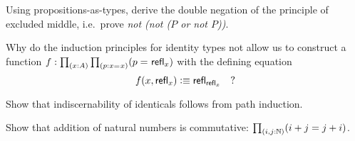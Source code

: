 \begin{solution}[Zack]
  
\end{solution}

\begin{ex}\label{ex:not-not-lem}
  Using propositions-as-types, derive the double negation of the principle of excluded middle, i.e.\ prove \emph{not (not ($P$ or not $P$))}.
\end{ex}

\begin{solution}[Alan]
  
\end{solution}

\begin{solution}[Zack]
  
\end{solution}

\begin{ex}\label{ex:without-K}
  Why do the induction principles for identity types not allow us to construct a function $f: \prd{x:A}{p:\id{x}{x}} (\id{p}{\refl{x}})$ with the defining equation
  \[ f(x,\mathsf{refl}_{x}) \vcentcolon\equiv \mathsf{refl}_{\mathsf{refl}_{x}} \quad ?\]
\end{ex}

\begin{solution}[Daniel]
  
\end{solution}

\begin{solution}[Alex]
  
\end{solution}

\begin{solution}[James]
  
\end{solution}

\begin{ex}\label{ex:subtFromPathInd}
  Show that indiscernability of identicals follows from path induction.
\end{ex}

\begin{solution}[Steven]
  
\end{solution}

\begin{solution}[Jake]
  
\end{solution}

\begin{ex}\label{ex:add-nat-commutative}
  Show that addition of natural numbers is commutative: $\prd{i,j:\nat} (i+j=j+i)$.
\end{ex}

